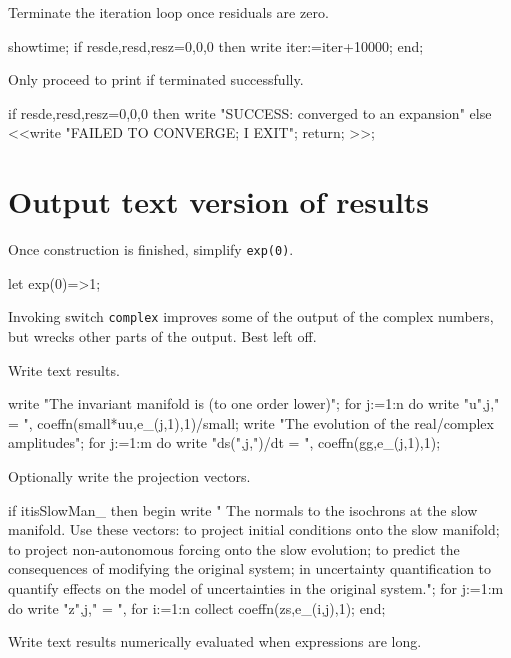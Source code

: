 \documentclass[11pt,a5paper]{article}
\begin{document}
Terminate the iteration loop once residuals are zero.
\begin{reduce}
showtime;
if {resde,resd,resz}={0,0,0} then write iter:=iter+10000;
end;
\end{reduce}

Only proceed to print if terminated successfully.
\begin{reduce}
if {resde,resd,resz}={0,0,0} 
  then write "SUCCESS: converged to an expansion"
  else <<write "FAILED TO CONVERGE; I EXIT";
    return; >>;
\end{reduce}





\section{Output text version of results}

Once construction is finished, simplify \verb|exp(0)|.
\begin{reduce}
let exp(0)=>1;
\end{reduce}

Invoking switch \verb|complex| improves some of the output
of the complex numbers, but wrecks other parts of the
output.  Best left off.


Write text results.
\begin{reduce}
write "The invariant manifold is (to one order lower)";
for j:=1:n do write "u",j," = ",
  coeffn(small*uu,e_(j,1),1)/small;
write "The evolution of the real/complex amplitudes";
for j:=1:m do write "ds(",j,")/dt = ",
  coeffn(gg,e_(j,1),1);
\end{reduce}

Optionally write the projection vectors.
\begin{reduce}
if itisSlowMan_ then begin write "
The normals to the isochrons at the slow manifold.
Use these vectors: to project initial conditions
onto the slow manifold; to project non-autonomous
forcing onto the slow evolution; to predict the
consequences of modifying the original system; in
uncertainty quantification to quantify effects on
the model of uncertainties in the original system.";
  for j:=1:m do write "z",j," = ",
    for i:=1:n collect coeffn(zs,e_(i,j),1);
end;
\end{reduce}

Write text results numerically evaluated when expressions
are long.
\end{document}
